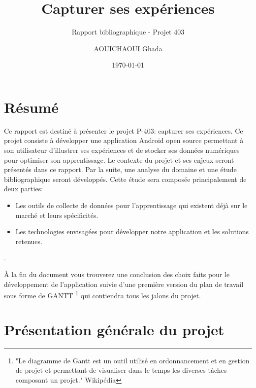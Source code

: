 \documentclass{report}
\author{AOUICHAOUI Ghada}
\date{\noexpand\today}
\title{Capturer ses expériences}
\subtitle{Rapport bibliographique - Projet 403}
\begin{document}
	
\imtaMaketitlepage

\tableofcontents

\newpage

\chapter{Résumé}
Ce rapport est destiné à présenter le projet P-403: capturer ses expériences. Ce projet consiste à développer une application Android open source permettant à son utilisateur d'illustrer ses expériences et de stocker ses données numériques pour optimiser son apprentissage. Le contexte du projet et ses enjeux seront présentés dans ce rapport. Par la suite, une analyse du domaine et une étude bibliographique seront développés. Cette étude sera composée principalement de deux parties:

\begin{itemize}
    \item Les outils de collecte de données pour l'apprentissage qui existent déjà sur le marché et leurs spécificités.
    \item Les technologies envisagées pour développer notre application et les solutions retenues.
\end{itemize}.

À la fin du document vous trouverez une conclusion des choix faits pour le développement de l'application suivie d'une première version du plan de travail sous forme de GANTT \footnote{"Le diagramme de Gantt est un outil utilisé en ordonnancement et en gestion de projet et permettant de visualiser dans le temps les diverses tâches composant un projet." Wikipédia} qui contiendra tous les jalons du projet.
\chapter{Présentation générale du projet}



\end{document}
